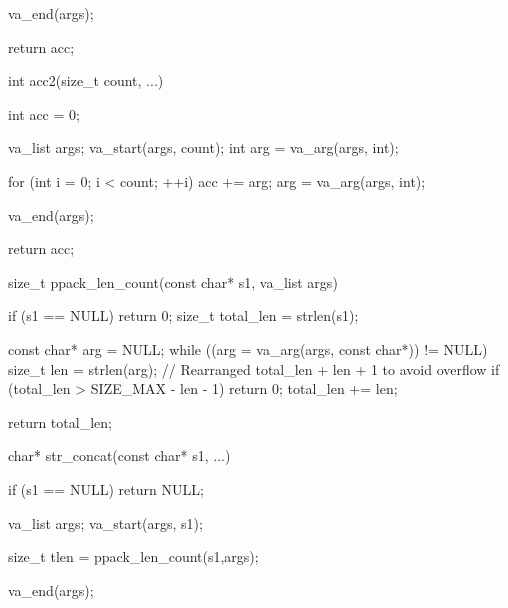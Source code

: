 \documentclass{report}
\begin{document}
\begin{itemize}
\begin{cppcode}
{                        va_end(args);

                        return acc;
                    }
                \end{cppcode}
                \bigbreak \noindent 
                \begin{cppcode}
                    int acc2(size_t count, ...) {
                        int acc = 0;

                        va_list args;
                        va_start(args, count); 
                        int arg = va_arg(args, int);

                        for (int i = 0; i < count; ++i) {
                            acc += arg; 
                            arg = va_arg(args, int);
                        }

                        va_end(args);

                        return acc;
                    }
                \end{cppcode}
                \bigbreak \noindent 
                \begin{cppcode}
                    size_t ppack_len_count(const char* s1, va_list args) {
                        if (s1 == NULL) return 0;
                        size_t total_len = strlen(s1);

                        const char* arg = NULL;
                        while ((arg = va_arg(args, const char*)) != NULL) {
                            size_t len = strlen(arg);
                            // Rearranged total_len + len + 1 to avoid overflow
                            if (total_len > SIZE_MAX - len - 1) {
                                return 0;
                            }
                            total_len += len;
                        }

                        return total_len;
                    }
                \end{cppcode}
                \bigbreak \noindent 
                \begin{cppcode}
                    char* str_concat(const char* s1, ...) {
                        if (s1 == NULL) {
                            return NULL;
                        }

                        va_list args;
                        va_start(args, s1);

                        size_t tlen = ppack_len_count(s1,args);

                        va_end(args);

}
\end{cppcode}
\end{itemize}
\end{document}
